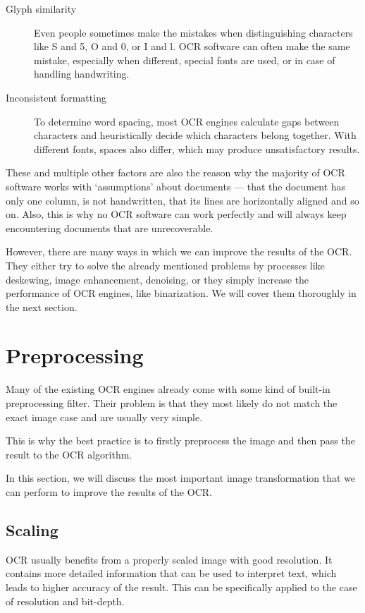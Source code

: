\begin{description}
\item[Glyph similarity] Even people sometimes make the mistakes when distinguishing characters like S and 5, O and 0, or I and l. OCR software can often make the same mistake, especially when different, special fonts are used, or in case of handling handwriting.
\item[Inconsistent formatting] To determine word spacing, most OCR engines calculate gaps between characters and heuristically decide which characters belong together. With different fonts, spaces also differ, which may produce unsatisfactory results.
\end{description}

These and multiple other factors are also the reason why the majority of OCR software works with `assumptions' about documents --- that the document has only one column, is not handwritten, that its lines are horizontally aligned and so on. Also, this is why no OCR software can work perfectly and will always keep encountering documents that are unrecoverable. 

However, there are many ways in which we can improve the results of the OCR. They either try to solve the already mentioned problems by processes like deskewing, image enhancement, denoising, or they simply increase the performance of OCR engines, like binarization. We will cover them thoroughly in the next section.

\section{Preprocessing}

Many of the existing OCR engines already come with some kind of built-in preprocessing filter. Their problem is that they most likely do not match the exact image case and are usually very simple.

This is why the best practice is to firstly preprocess the image and then pass the result to the OCR algorithm.

In this section, we will discuss the most important image transformation that we can perform to improve the results of the OCR. 

\subsection{Scaling}

OCR usually benefits from a properly scaled image with good resolution. It contains more detailed information that can be used to interpret text, which leads to higher accuracy of the result. This can be specifically applied to the case of resolution and bit-depth.

